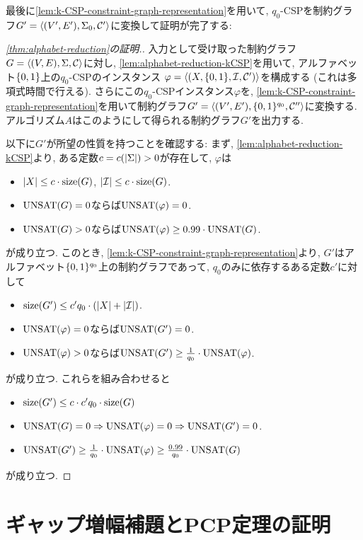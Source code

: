 最後に\cref{lem:k-CSP-constraint-graph-representation}を用いて, $q_0$-CSPを制約グラフ$G'=\langle(V',E'),\Sigma_0,\mathcal{C}'\rangle$に変換して証明が完了する:
\begin{proof}[\cref{thm:alphabet-reduction}の証明.]
  入力として受け取った制約グラフ$G=\langle(V,E),\Sigma,\mathcal{C}\rangle$に対し, \cref{lem:alphabet-reduction-kCSP}を用いて, アルファベット$\{0,1\}$上の$q_0$-CSPのインスタンス $\varphi=\langle(X,\{0,1\},\mathcal{I},\mathcal{C}')\rangle$を構成する (これは多項式時間で行える).
  さらにこの$q_0$-CSPインスタンス$\varphi$を, \cref{lem:k-CSP-constraint-graph-representation}を用いて制約グラフ$G'=\langle(V',E'),\{0,1\}^{q_0},\mathcal{C}''\rangle$に変換する.
  アルゴリズム$A$はこのようにして得られる制約グラフ$G'$を出力する.

  以下に$G'$が所望の性質を持つことを確認する:
  まず, \cref{lem:alphabet-reduction-kCSP}より, ある定数$c=c(\abs{\Sigma})>0$が存在して, $\varphi$は
  \begin{itemize}
    \item $\abs{X} \le c\cdot\mathrm{size}(G)$, $\abs{\mathcal{I}} \le c\cdot\mathrm{size}(G)$.
    \item $\mathrm{UNSAT}(G)=0$ならば$\mathrm{UNSAT}(\varphi)=0$.
    \item $\mathrm{UNSAT}(G)>0$ならば$\mathrm{UNSAT}(\varphi) \ge 0.99\cdot\mathrm{UNSAT}(G)$.
  \end{itemize}
  が成り立つ.
  このとき, \cref{lem:k-CSP-constraint-graph-representation}より, $G'$はアルファベット$\{0,1\}^{q_0}$上の制約グラフであって, $q_0$のみに依存するある定数$c'$に対して
  \begin{itemize}
    \item $\mathrm{size}(G') \le c'q_0\cdot (\abs{X} + \abs{\mathcal{I}})$.
    \item $\mathrm{UNSAT}(\varphi)=0$ならば$\mathrm{UNSAT}(G')=0$.
    \item $\mathrm{UNSAT}(\varphi)>0$ならば$\mathrm{UNSAT}(G') \ge \frac{1}{q_0}\cdot\mathrm{UNSAT}(\varphi)$.
  \end{itemize}
  が成り立つ.
  これらを組み合わせると
  \begin{itemize}
    \item $\mathrm{size}(G') \le c\cdot c'q_0\cdot\mathrm{size}(G)$
    \item $\mathrm{UNSAT}(G)=0 \Rightarrow \mathrm{UNSAT}(\varphi)=0\Rightarrow \mathrm{UNSAT}(G')=0$.
    \item $\mathrm{UNSAT}(G') \ge \frac{1}{q_0}\cdot \mathrm{UNSAT}(\varphi) \ge \frac{0.99}{q_0}\cdot \mathrm{UNSAT}(G)$
  \end{itemize}
  が成り立つ.
\end{proof}

\section{ギャップ増幅補題とPCP定理の証明}

